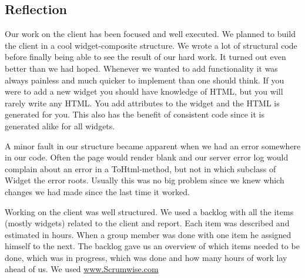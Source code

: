 \subsection{Reflection}
Our work on the client has been focused and well executed. We planned to build the client in a cool widget-composite structure. We wrote a lot of structural code before finally being able to see the result of our hard work. It turned out even better than we had hoped. Whenever we wanted to add functionality it was always painless and much quicker to implement than one should think. If you were to add a new widget you should have knowledge of HTML, but you will rarely write any HTML. You add attributes to the widget and the HTML is generated for you. This also has the benefit of consistent code since it is generated alike for all widgets.

A minor fault in our structure became apparent when we had an error somewhere in our code. Often the page would render blank and our server error log would complain about an error in a ToHtml-method, but not in which subclass of Widget the error roots. Usually this was no big problem since we knew which changes we had made since the last time it worked.

Working on the client was well structured. We used a backlog with all the items (mostly widgets) related to the client and report. Each item was described and estimated in hours. When a group member was done with one item he assigned himself to the next. The backlog gave us an overview of which items needed to be done, which was in progress, which was done and how many hours of work lay ahead of us. We used \url{www.Scrumwise.com}
\newpage